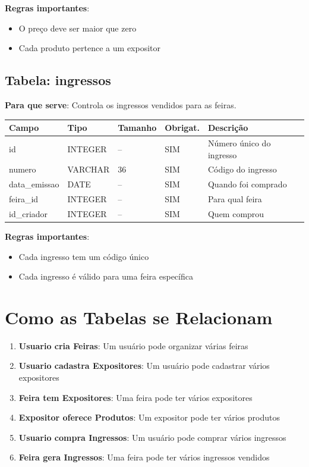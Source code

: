 \documentclass[12pt,a4paper]{article}
\begin{document}
\textbf{Regras importantes}:
\begin{itemize}
    \item O preço deve ser maior que zero
    \item Cada produto pertence a um expositor
\end{itemize}

\subsection{Tabela: ingressos}

\textbf{Para que serve}: Controla os ingressos vendidos para as feiras.

\begin{longtable}{|p{3cm}|p{2cm}|p{2cm}|p{1.5cm}|p{5cm}|}
\hline
\textbf{Campo} & \textbf{Tipo} & \textbf{Tamanho} & \textbf{Obrigat.} & \textbf{Descrição} \\
\hline
\endhead
id & INTEGER & -- & SIM & Número único do ingresso \\
\hline
numero & VARCHAR & 36 & SIM & Código do ingresso \\
\hline
data\_emissao & DATE & -- & SIM & Quando foi comprado \\
\hline
feira\_id & INTEGER & -- & SIM & Para qual feira \\
\hline
id\_criador & INTEGER & -- & SIM & Quem comprou \\
\hline
\end{longtable}

\textbf{Regras importantes}:
\begin{itemize}
    \item Cada ingresso tem um código único
    \item Cada ingresso é válido para uma feira específica
\end{itemize}

\section{Como as Tabelas se Relacionam}

\begin{enumerate}
    \item \textbf{Usuario cria Feiras}: Um usuário pode organizar várias feiras
    \item \textbf{Usuario cadastra Expositores}: Um usuário pode cadastrar vários expositores
    \item \textbf{Feira tem Expositores}: Uma feira pode ter vários expositores
    \item \textbf{Expositor oferece Produtos}: Um expositor pode ter vários produtos
    \item \textbf{Usuario compra Ingressos}: Um usuário pode comprar vários ingressos
    \item \textbf{Feira gera Ingressos}: Uma feira pode ter vários ingressos vendidos
\end{enumerate}
\end{document}
